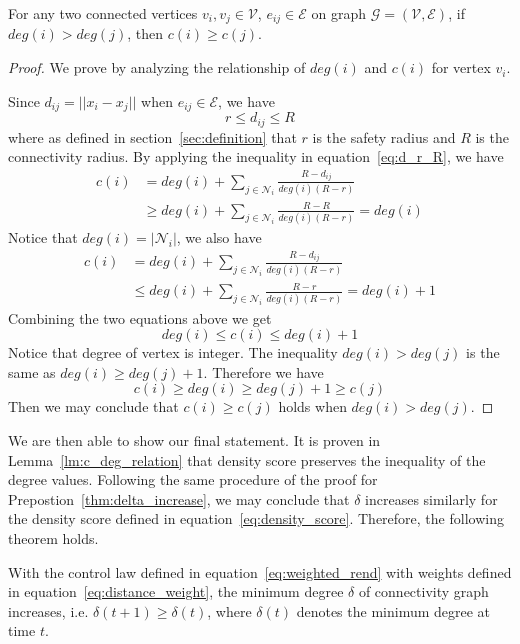 \documentclass[../main.tex]{subfiles}
\begin{document}
\begin{lemma}\label{lm:c_deg_relation}
For any two connected vertices $v_i, v_j \in \mathcal{V}$, $e_{ij} \in \mathcal{E}$ on graph $\mathcal{G} = (\mathcal{V}, \mathcal{E})$, if $deg(i) > deg(j)$, then $c(i) \geq c(j)$.
\end{lemma}
\begin{proof}
We prove by analyzing the relationship of $deg(i)$ and $c(i)$ for vertex $v_i$.

Since $d_{ij} = ||x_i - x_j||$ when $e_{ij} \in \mathcal{E}$, we have
\begin{equation} \label{eq:d_r_R}  
r \leq d_{ij} \leq R
\end{equation}
where as defined in section~\ref{sec:definition} that $r$ is the safety radius and $R$ is the connectivity radius. By applying the inequality in equation~\ref{eq:d_r_R}, we have
{\small \begin{align*}
c(i) &= deg(i) + \sum_{j \in \mathcal{N}_i} \frac{R - d_{ij}}{deg(i) (R - r)} \\
&\geq deg(i) + \sum_{j \in \mathcal{N}_i} \frac{R - R}{deg(i) (R - r)} = deg(i)
\end{align*}}
Notice that $deg(i) = |\mathcal{N}_i|$, we also have
{\small \begin{align*}
c(i) &= deg(i) + \sum_{j \in \mathcal{N}_i} \frac{R - d_{ij}}{deg(i) (R - r)} \\
&\leq deg(i) + \sum_{j \in \mathcal{N}_i} \frac{R - r}{deg(i) (R - r)} = deg(i) + 1
\end{align*}}
Combining the two equations above we get
\begin{equation} 
deg(i) \leq c(i) \leq deg(i) + 1
\end{equation}
Notice that degree of vertex is integer. The inequality $deg(i) > deg(j)$ is the same as $deg(i) \geq deg(j) + 1$. Therefore we have
\begin{equation} 
c(i) \geq deg(i) \geq deg(j) + 1 \geq c(j)
\end{equation}
Then we may conclude that $c(i) \geq c(j)$ holds when $deg(i) > deg(j)$.
\end{proof}
We are then able to show our final statement. It is proven in Lemma~\ref{lm:c_deg_relation} that density score preserves the inequality of the degree values. Following the same procedure of the proof for Prepostion~\ref{thm:delta_increase}, we may conclude that $\delta$ increases similarly for the density score defined in equation~\ref{eq:density_score}. Therefore, the following theorem holds.
\begin{theorem}
With the control law defined in equation~\ref{eq:weighted_rend} with weights defined in equation~\ref{eq:distance_weight}, the minimum degree $\delta$ of connectivity graph increases, i.e. $\delta(t+1) \geq \delta(t)$, where $\delta(t)$ denotes the minimum degree at time $t$. 
\end{theorem}
\end{document}
